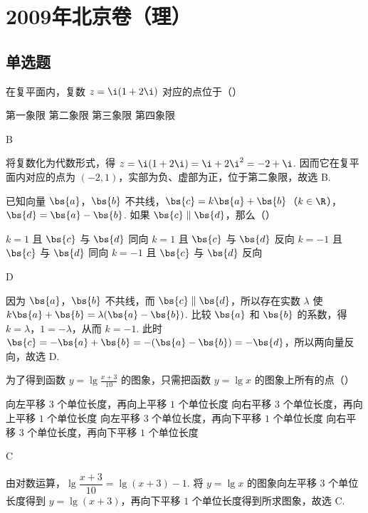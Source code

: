 \chapter{2009年北京卷（理）}

\section{单选题}

\begin{problem}
在复平面内，复数 \(z = \i(1 + 2\i)\) 对应的点位于（\quad）

\choices
    {第一象限}
    {第二象限}
    {第三象限}
    {第四象限}

\begin{answer}
B
\end{answer}

\begin{solution}
将复数化为代数形式，得 \(z=\i(1+2\i)=\i+2\i^2=-2+\i\). 因而它在复平面内对应的点为 \((-2,1)\)，实部为负、虚部为正，位于第二象限，故选 B.
\end{solution}
\end{problem}

\begin{problem}
已知向量 \(\bs{a}\)，\(\bs{b}\) 不共线，\(\bs{c} = k\bs{a} + \bs{b}\)（\(k \in \R\)），\(\bs{d} = \bs{a} - \bs{b}\). 如果 \(\bs{c} \parallel \bs{d}\)，那么（\quad）

\choices
    {\(k = 1\) 且 \(\bs{c}\) 与 \(\bs{d}\) 同向}
    {\(k = 1\) 且 \(\bs{c}\) 与 \(\bs{d}\) 反向}
    {\(k = -1\) 且 \(\bs{c}\) 与 \(\bs{d}\) 同向}
    {\(k = -1\) 且 \(\bs{c}\) 与 \(\bs{d}\) 反向}

\begin{answer}
D
\end{answer}

\begin{solution}
因为 \(\bs{a}\)，\(\bs{b}\) 不共线，而 \(\bs{c}\parallel\bs{d}\)，所以存在实数 \(\lambda\) 使 \(k\bs{a}+\bs{b}=\lambda(\bs{a}-\bs{b})\). 比较 \(\bs{a}\) 和 \(\bs{b}\) 的系数，得 \(k=\lambda\)，\(1=-\lambda\)，从而 \(k=-1\). 此时 \(\bs{c}=-\bs{a}+\bs{b}=-(\bs{a}-\bs{b})=-\bs{d}\)，所以两向量反向，故选 D.
\end{solution}
\end{problem}

\begin{problem}
为了得到函数 \( y = \lg \frac{x + 3}{10} \) 的图象，只需把函数 \( y = \lg x \) 的图象上所有的点（\quad）

\choices
    {向左平移 \(3\) 个单位长度，再向上平移 \(1\) 个单位长度}
    {向右平移 \(3\) 个单位长度，再向上平移 \(1\) 个单位长度}
    {向左平移 \(3\) 个单位长度，再向下平移 \(1\) 个单位长度}
    {向右平移 \(3\) 个单位长度，再向下平移 \(1\) 个单位长度}

\begin{answer}
C
\end{answer}

\begin{solution}
由对数运算，\(\lg\dfrac{x+3}{10}=\lg(x+3)-1\). 将 \(y=\lg x\) 的图象向左平移 \(3\) 个单位长度得到 \(y=\lg(x+3)\)，再向下平移 \(1\) 个单位长度得到所求图象，故选 C.
\end{solution}
\end{problem}

